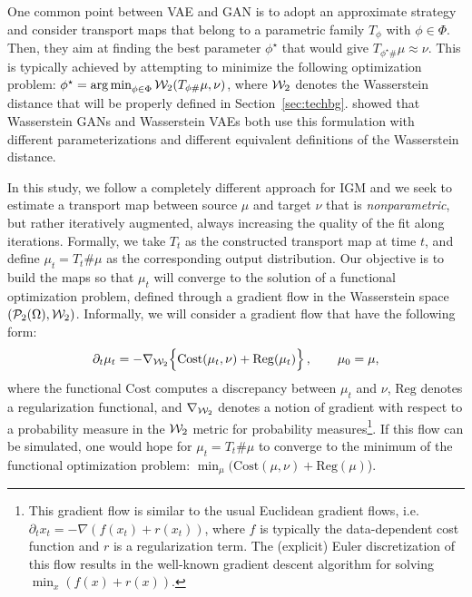 One common point between VAE and GAN is to adopt an approximate strategy and consider transport maps that belong to a parametric family $T_{\phi}$ with $\phi \in \Phi$. Then, they aim at finding the best parameter $\phi^\star$ that would give $T_{\phi^\star \#}\mu \approx \nu$. This is typically achieved by attempting to minimize the following optimization problem:
$\phi^\star = \operatorname*{arg\min}_{\phi \in \Phi} {\cal W}_2(T_{\phi \#}\mu, \nu)$,
where ${\cal W}_2$ denotes the Wasserstein distance that will be properly defined in Section~\ref{sec:techbg}.  \cite{genevay2017gan} showed that Wasserstein GANs \cite{arjovsky2017wasserstein} and Wasserstein VAEs \cite{tolstikhin2017wasserstein} both use this formulation with different parameterizations and different equivalent definitions of the Wasserstein distance. 

In this study, we follow a completely different approach for IGM and we seek to estimate a transport map between source $\mu$ and target $\nu$ that is \textit{nonparametric}, but rather iteratively augmented, always increasing the quality of the fit along iterations. Formally, we take $T_t$ as the constructed transport map at time $t$, and define $\mu_t=T_t \# \mu$ as the corresponding output distribution. Our objective is to build the maps so that $\mu_t$ will converge to the solution of a functional optimization problem, defined through a gradient flow in the Wasserstein space $({\cal P}_2(\Omega),{\cal W}_2)$. Informally, we will consider a gradient flow that have the following form:
\begin{align}
\partial_t \mu_t = - \nabla_{{\cal W}_2} \Bigl\{ \mathrm{Cost}(\mu_t, \nu) + \mathrm{Reg}(\mu_t)\Bigr\} \, , \qquad \mu_0 = \mu,\label{eqn:gradflow}
\end{align}
where the functional $\mathrm{Cost}$ computes a discrepancy between $\mu_t$ and $\nu$, $\mathrm{Reg}$ denotes a regularization functional, and $\nabla_{{\cal W}_2}$ denotes a notion of gradient with respect to a probability measure in the ${\cal W}_2$ metric for probability measures\footnote{This gradient flow is similar to the usual Euclidean gradient flows, i.e.\ $\partial_t x_t = - \nabla (f(x_t) + r(x_t))$, where $f$ is typically the data-dependent cost function and $r$ is a regularization term. The (explicit) Euler discretization of this flow results in the well-known gradient descent algorithm for solving $\min_x (f(x)+r(x))$.}. If this flow can be simulated, one would hope for $\mu_t=T_t\#\mu$ to converge to the minimum of the functional optimization problem: $\min_\mu ( \mathrm{Cost}(\mu, \nu) + \mathrm{Reg}(\mu)$).


